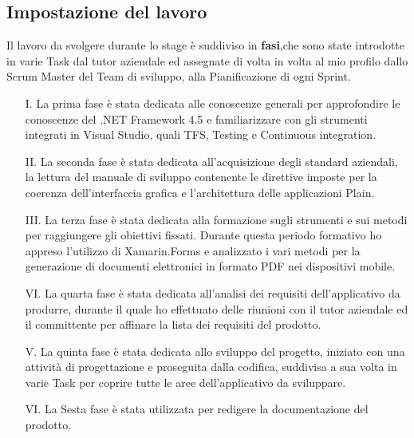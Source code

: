 \subsection{Impostazione del lavoro}
Il lavoro da svolgere durante lo stage è suddiviso in \textbf{fasi},che sono state introdotte in varie Task dal tutor aziendale ed assegnate di volta in volta al mio profilo dallo Scrum Master del Team di sviluppo, alla Pianificazione di ogni Sprint.
\begin{itemize}
	\item[I.] La prima fase è stata dedicata alle conoscenze generali per approfondire le conoscenze del .NET Framework 4.5 e familiarizzare con gli strumenti integrati in Visual Studio, quali TFS, Testing e Continuous integration.
	\item[II.] La seconda fase è stata dedicata all'acquisizione degli standard aziendali, la lettura del manuale di sviluppo contenente le direttive imposte per la coerenza dell'interfaccia grafica e l'architettura delle applicazioni Plain.
	\item[III.] La terza fase è stata dedicata alla formazione sugli strumenti e sui metodi per raggiungere gli obiettivi fissati. Durante questa periodo formativo ho appreso l'utilizzo di Xamarin.Forms e analizzato i vari metodi per la generazione di documenti elettronici in formato PDF nei dispositivi mobile.
	\item[VI.] La quarta fase è stata dedicata all'analisi dei requisiti dell'applicativo da produrre, durante il quale ho effettuato delle riunioni con il tutor aziendale ed il committente per affinare la lista dei requisiti del prodotto.
	\item[V.] La quinta fase è stata dedicata allo sviluppo del progetto, iniziato con una attività di progettazione e proseguita dalla codifica, suddivisa a sua volta in varie Task per coprire tutte le aree dell'applicativo da sviluppare. 
	\item[VI.] La Sesta fase è stata utilizzata per redigere la documentazione del prodotto.
\end{itemize}









